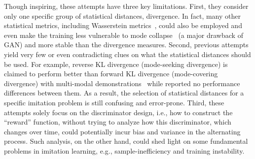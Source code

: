 Though inspiring, these attempts have three key limitations.
First, they consider only one specific group of statistical distances, divergence. 
In fact, many other statistical metrics, including Wasserstein metrics~\citep{arjovsky2017wasserstein,xiao2019wasserstein}, could also be employed and even make the training less vulnerable to mode collapse~\citep{che2016mode} (a major drawback of GAN) and more stable than the divergence measures. 
Second, previous attempts yield very few or even contradicting clues on what the statistical distances should be used. 
For example, reverse KL divergence (mode-seeking divergence) is claimed to perform better than forward KL divergence (mode-covering divergence) with multi-modal demonstrations~\citep{ke2019imitation} while \citet{ghasemipour2020divergence} reported no performance differences between them. 
As a result, the selection of statistical distances for a specific imitation problem is still confusing and error-prone. 
Third, these attempts solely focus on the discriminator design, i.e., how to construct the ``reward'' function, without trying to analyze how this discriminator, which changes over time, could potentially incur bias and variance in the alternating process. 
Such analysis, on the other hand, could shed light on some fundamental problems in imitation learning, e.g., sample-inefficiency and training instability. 





